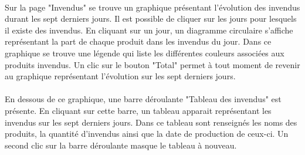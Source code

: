 \paragraph{}
Sur la page "Invendus" se trouve un graphique présentant l'évolution des 
invendus durant les sept derniers jours. Il est possible de cliquer sur les 
jours pour lesquels il existe des invendus. En cliquant sur un jour, un 
diagramme circulaire s'affiche représentant la part de chaque produit dans les 
invendus du jour. Dans ce graphique se trouve une légende qui liste les 
différentes couleurs associées aux produits invendus. Un clic sur le bouton 
"Total" permet à tout moment de revenir au graphique représentant l'évolution 
sur les sept derniers jours.

\paragraph{}
En dessous de ce graphique, une barre déroulante "Tableau des invendus" est 
présente. En cliquant sur cette barre, un tableau apparait représentant les
invendus sur les sept derniers jours. Dans ce tableau sont renseignés les noms 
des produits, la quantité d'invendus ainsi que la date de production de ceux-ci.
Un second clic sur la barre déroulante masque le tableau à nouveau.
